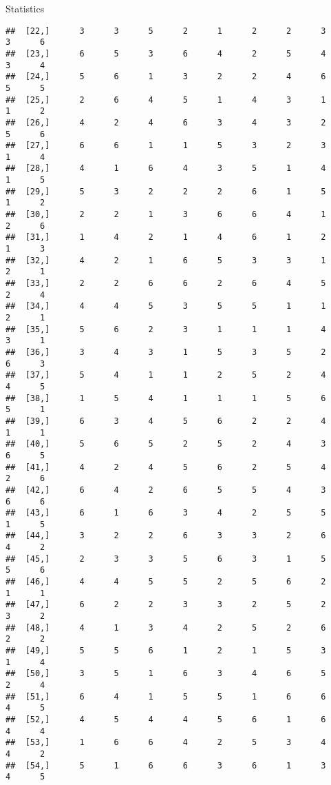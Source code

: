 \documentclass[
  ignorenonframetext,
]{beamer}
\begin{document}
\begin{frame}[fragile]{Statistics}
\begin{verbatim}
##  [22,]      3      3      5      2      1      2      2      3      3      6
##  [23,]      6      5      3      6      4      2      5      4      3      4
##  [24,]      5      6      1      3      2      2      4      6      5      5
##  [25,]      2      6      4      5      1      4      3      1      1      2
##  [26,]      4      2      4      6      3      4      3      2      5      6
##  [27,]      6      6      1      1      5      3      2      3      1      4
##  [28,]      4      1      6      4      3      5      1      4      1      5
##  [29,]      5      3      2      2      2      6      1      5      1      2
##  [30,]      2      2      1      3      6      6      4      1      2      6
##  [31,]      1      4      2      1      4      6      1      2      1      3
##  [32,]      4      2      1      6      5      3      3      1      2      1
##  [33,]      2      2      6      6      2      6      4      5      2      4
##  [34,]      4      4      5      3      5      5      1      1      2      1
##  [35,]      5      6      2      3      1      1      1      4      3      1
##  [36,]      3      4      3      1      5      3      5      2      6      3
##  [37,]      5      4      1      1      2      5      2      4      4      5
##  [38,]      1      5      4      1      1      1      5      6      5      1
##  [39,]      6      3      4      5      6      2      2      4      1      1
##  [40,]      5      6      5      2      5      2      4      3      6      5
##  [41,]      4      2      4      5      6      2      5      4      2      6
##  [42,]      6      4      2      6      5      5      4      3      6      6
##  [43,]      6      1      6      3      4      2      5      5      1      5
##  [44,]      3      2      2      6      3      3      2      6      4      2
##  [45,]      2      3      3      5      6      3      1      5      5      6
##  [46,]      4      4      5      5      2      5      6      2      1      1
##  [47,]      6      2      2      3      3      2      5      2      3      2
##  [48,]      4      1      3      4      2      5      2      6      2      2
##  [49,]      5      5      6      1      2      1      5      3      1      4
##  [50,]      3      5      1      6      3      4      6      5      2      4
##  [51,]      6      4      1      5      5      1      6      6      4      5
##  [52,]      4      5      4      4      5      6      1      6      4      4
##  [53,]      1      6      6      4      2      5      3      4      4      2
##  [54,]      5      1      6      6      3      6      1      3      4      5

\end{verbatim}
\end{frame}
\end{document}
